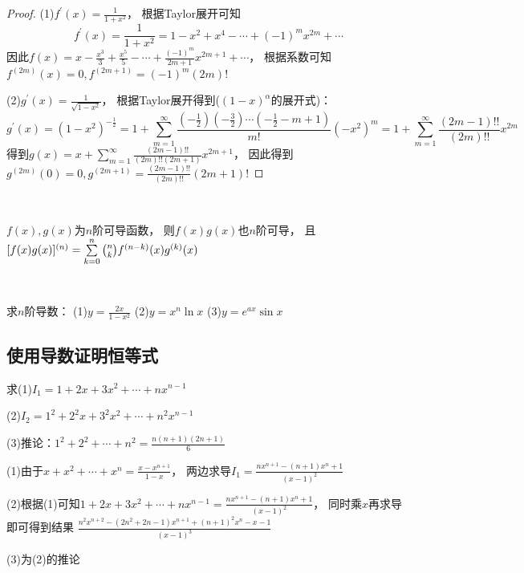 \begin{proof}
  (1)$f^{\prime}(x) = \frac{1}{1 + x^2}$，
  根据Taylor展开可知
  \begin{equation*}
    f^{\prime}(x) = \frac{1}{1+x^2} = 1 - x^2 + x^4 - \cdots + (-1)^mx^{2m} + \cdots
  \end{equation*}
  因此$f(x) = x - \frac{x^3}{3} + \frac{x^5}{5} - \cdots +  \frac{(-1)^m}{2m+1} x^{2m+1} + \cdots$，
  根据系数可知$f^{(2m)}(x) = 0, f^{(2m+1)} = (-1)^m(2m)!$

  (2)$g^{\prime}(x) = \frac{1}{\sqrt{1 - x^2}}$，
  根据Taylor展开得到($(1 - x)^{\alpha}$的展开式)：
  \begin{equation*}
    g^{\prime}(x) = (1 - x^2)^{- \frac{1}{2}} = 1 + \sum\limits_{m = 1}^{\infty} \frac{(-\frac{1}{2})(-\frac{3}{2})\cdots (- \frac{1}{2} - m + 1)}{m!}(-x^2)^m = 1 + \sum\limits_{m = 1}^{\infty}\frac{(2m - 1)!!}{(2m)!!}x^{2m}
  \end{equation*}
  得到$g(x) = x + \sum\limits_{m = 1}^{\infty}\frac{(2m-1)!!}{(2m)!!(2m+1)}x^{2m+1}$，
  因此得到$g^{(2m)}(0) = 0, g^{(2m+1)} = \frac{(2m-1)!!}{(2m)!!}(2m+1)!$
\end{proof}

~

\begin{theorem}[Leibniz公式]
  $f(x),g(x)$为$n$阶可导函数，
  则$f(x)g(x)$也$n$阶可导，
  且$[f(x)g(x)]^{(n)} = \sum\limits_{k = 0}^n \tbinom{n}{k}f^{(n-k)}(x)g^{(k)}(x)$
\end{theorem}

~

\begin{exercise}[Leibniz公式练习]
  求$n$阶导数：
  (1)$y = \frac{2x}{1 - x^2}$
  (2)$y = x^n \ln x$
  (3)$y = e^{ax}\sin x$
\end{exercise}


\subsection{使用导数证明恒等式}

\begin{exercise}[使用导数构造]
  求(1)$I_1 = 1 + 2x + 3x^2 + \cdots + nx^{n-1}$

  (2)$I_2 = 1^2 + 2^2x + 3^2 x^2 + \cdots + n^2x^{n-1}$

  (3)推论：$1^2 + 2^2 + \cdots + n^2 = \frac{n(n+1)(2n+1)}{6}$
\end{exercise}

\begin{solution}
  (1)由于$x + x^2 + \cdots + x^n = \frac{x - x^{n+1}}{1 - x}$，
  两边求导$I_1 = \frac{nx^{n+1} - (n+1)x^n + 1}{(x - 1)^2}$

  (2)根据(1)可知$1 + 2x + 3x^2 + \cdots + nx^{n-1} = \frac{nx^{n+1} - (n+1)x^n + 1}{(x-1)^2}$，
  同时乘$x$再求导即可得到结果
  $\frac{n^2x^{n+2} - (2n^2 + 2n - 1)x^{n+1} + (n+1)^2 x^n - x - 1}{(x - 1)^3}$

  (3)为(2)的推论
\end{solution}



